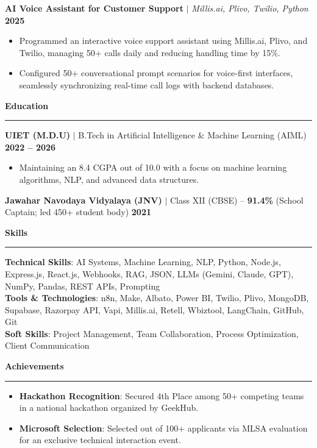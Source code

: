 \documentclass[letterpaper,10pt]{article}
\newcommand{\resumeSection}[2]{
  \vspace{4pt}
  \textbf{\large\color{primaryblue}#1\hspace{0.5em}#2}
  \vspace{1pt}
  {\color{primaryblue}\hrule}
  \vspace{2.5pt}
}
\begin{document}
\vspace{2.5pt}
\noindent
\textbf{AI Voice Assistant for Customer Support} $|$ \textit{Millis.ai, Plivo, Twilio, Python} \hfill \textbf{2025}
\begin{itemize}
    \item Programmed an interactive voice support assistant using Millis.ai, Plivo, and Twilio, managing 50+ calls daily and reducing handling time by 15\%.
    \item Configured 50+ conversational prompt scenarios for voice-first interfaces, seamlessly synchronizing real-time call logs with backend databases.
\end{itemize}


\resumeSection{\faGraduationCap}{Education}

\noindent
\textbf{UIET (M.D.U)} $|$ B.Tech in Artificial Intelligence \& Machine Learning (AIML) \hfill \textbf{2022 -- 2026}
\begin{itemize}
    \item Maintaining an 8.4 CGPA out of 10.0 with a focus on machine learning algorithms, NLP, and advanced data structures.
\end{itemize}

\vspace{2.5pt}
\noindent
\textbf{Jawahar Navodaya Vidyalaya (JNV)} $|$ Class XII (CBSE) -- \textbf{91.4\%} (School Captain; led 450+ student body) \hfill \textbf{2021}


\resumeSection{\faTools}{Skills}
\noindent
\small
\textbf{Technical Skills}: AI Systems, Machine Learning, NLP, Python, Node.js, Express.js, React.js, Webhooks, RAG, JSON, LLMs (Gemini, Claude, GPT), NumPy, Pandas, REST APIs, Prompting \\ \vspace{1.5pt}
\textbf{Tools \& Technologies}: n8n, Make, Albato, Power BI, Twilio, Plivo, MongoDB, Supabase, Razorpay API, Vapi, Millis.ai, Retell, Wbiztool, LangChain, GitHub, Git \\ \vspace{1.5pt}
\textbf{Soft Skills}: Project Management, Team Collaboration, Process Optimization, Client Communication


\resumeSection{\faTrophy}{Achievements}
\begin{itemize}
    \item \textbf{Hackathon Recognition}: Secured 4th Place among 50+ competing teams in a national hackathon organized by GeekHub.
    \item \textbf{Microsoft Selection}: Selected out of 100+ applicants via MLSA evaluation for an exclusive technical interaction event.
\end{itemize}

\end{document}
